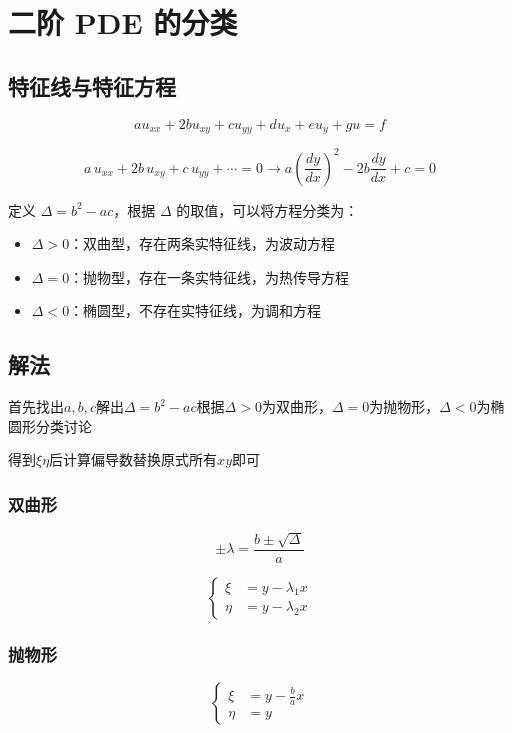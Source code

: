 \section{二阶 PDE 的分类}

\subsection{特征线与特征方程}
\[
a u_{xx} + 2b u_{xy} + c u_{yy} + d u_x + e u_y + g u = f
\]

\[
a \, u_{xx} + 2b \, u_{xy} + c \, u_{yy} + \cdots = 0 \rightarrow a \left( \frac{dy}{dx} \right)^2 - 2b \frac{dy}{dx} + c = 0
\]

定义 $\Delta = b^2 - ac$，根据 $\Delta$ 的取值，可以将方程分类为：
\begin{itemize}
    \item $\Delta > 0$：双曲型，存在两条实特征线，为波动方程
    \item $\Delta = 0$：抛物型，存在一条实特征线，为热传导方程
    \item $\Delta < 0$：椭圆型，不存在实特征线，为调和方程
\end{itemize}


\subsection{解法}

首先找出$a,b,c$解出$\Delta = b^2 - ac$根据$\Delta > 0$为双曲形，$\Delta = 0$为抛物形，$\Delta < 0$为椭圆形分类讨论

得到$\xi \eta$后计算偏导数替换原式所有$xy$即可

\subsubsection{双曲形}

\[
\pm \lambda = \frac{b \pm \sqrt{\Delta}}{a}
\]

\[
\left\{
\begin{aligned}
\xi &= y - \lambda_1 x \\
\eta &= y - \lambda_2 x
\end{aligned}
\right.
\]

\subsubsection{抛物形}

\[
\left\{
\begin{aligned}
\xi &= y - \frac{b}{a} x \\
\eta &= y
\end{aligned}
\right.
\]

